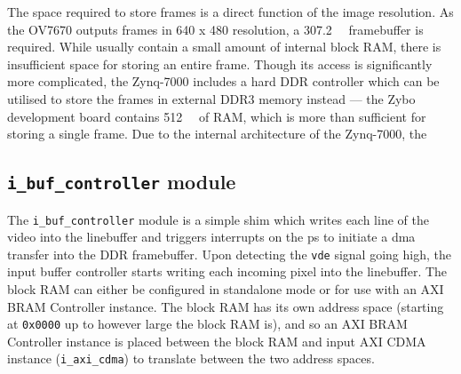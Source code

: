 The space required to store frames is a direct function of the image resolution. As the OV7670 outputs frames in 640 x 480 resolution, a \SI{307.2}{\kilo\bytes} framebuffer is required. While  usually contain a small amount of internal block RAM, there is insufficient space for storing an entire frame. Though its access is significantly more complicated, the Zynq-7000 includes a hard DDR controller which can be utilised to store the frames in external DDR3 memory instead --- the Zybo development board contains \SI{512}{\mega\bytes} of RAM, which is more than sufficient for storing a single frame. Due to the internal architecture of the Zynq-7000, the 

\subsection{\texttt{i\_buf\_controller} module}

The \texttt{i_buf_controller} module is a simple shim which writes each line of the video into the linebuffer and triggers interrupts on the \gls{ps} to initiate a \gls{dma} transfer into the DDR framebuffer. Upon detecting the \texttt{vde} signal going high, the input buffer controller starts writing each incoming pixel into the linebuffer. The block RAM can either be configured in standalone mode or for use with an AXI BRAM Controller instance. The block RAM has its own address space (starting at \texttt{0x0000} up to however large the block RAM is), and so an AXI BRAM Controller instance is placed between the block RAM and input AXI CDMA instance (\texttt{i\_axi\_cdma}) to translate between the two address spaces.

